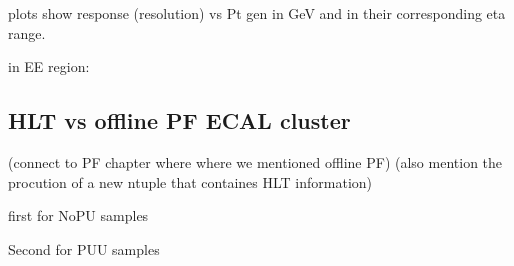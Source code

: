 plots show response (resolution) vs Pt gen in GeV and in their corresponding eta range.






in EE region:





\subsection{HLT vs offline PF ECAL cluster}

(connect to PF chapter where where we mentioned offline PF)
(also mention the procution of a new ntuple that containes HLT information) 

first for NoPU samples

Second for PUU samples

